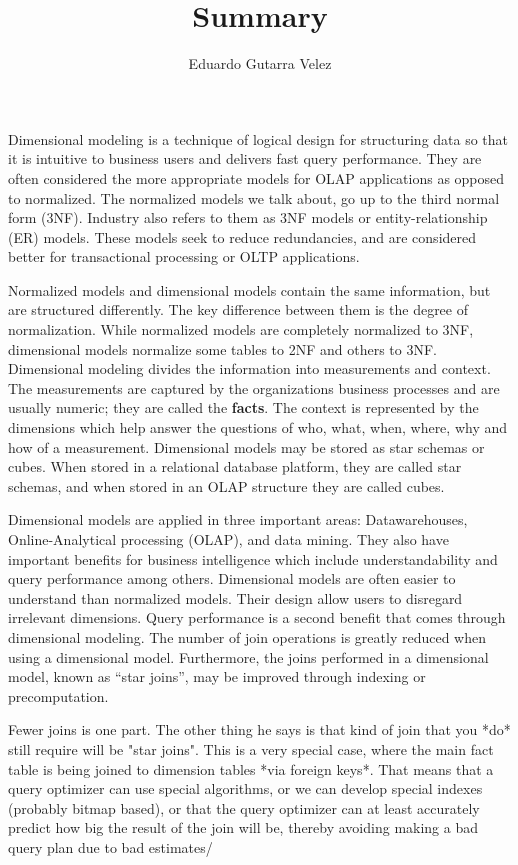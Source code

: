 \documentclass[]{article}
\title{Summary}
\author{Eduardo Gutarra Velez}
\begin{document}
\ifpdf
{}
\else
{}
\fi

\maketitle

Dimensional modeling is a technique of logical design for structuring data so that it is intuitive to business users and delivers fast
query performance. They are often considered the more appropriate models for OLAP applications as opposed to normalized. The normalized
models we talk about, go up to the third normal form (3NF). Industry also refers to them as 3NF models or entity-relationship (ER)
models. These models seek to reduce redundancies, and are considered better for transactional processing or OLTP applications.

Normalized models and dimensional models contain the same information, but are structured differently. The key difference between them
is the degree of normalization. While normalized models are completely normalized to 3NF, dimensional models normalize some tables to
2NF and others to 3NF. Dimensional modeling divides the information into measurements and context. The measurements are captured by the
organizations business processes and are usually numeric; they are called the \textbf{facts}. The context is represented by the
dimensions which help answer the questions of who, what, when, where, why and how of a measurement. Dimensional models may be stored as
star schemas or cubes. When stored in a relational database platform, they are called star schemas, and when stored in an OLAP structure
they are called cubes. 

Dimensional models are applied in three important areas: Datawarehouses, Online-Analytical processing (OLAP), and data mining. They also have important benefits
for business intelligence which include understandability and query performance among others. Dimensional models are often easier to understand than normalized
models. Their design allow users to disregard irrelevant dimensions. Query performance is a second benefit that comes through dimensional modeling. The number of
join operations is greatly reduced when using a dimensional model. Furthermore, the joins performed in a dimensional model, known as ``star joins'', may be improved through indexing or precomputation.

Fewer joins is one part. The other thing he says is that kind of join that you *do* still require will be "star joins". This is a very special case, where the
main fact table is being joined to dimension tables *via foreign keys*. That means that a query optimizer can use special algorithms, or we can develop special
indexes (probably bitmap based), or that the query optimizer can at least accurately predict how big the result of the join will be, thereby avoiding making a
bad query plan due to bad estimates/
\end{document}
